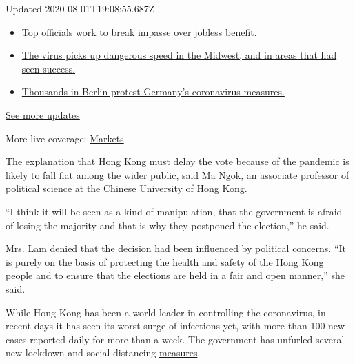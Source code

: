 Updated 2020-08-01T19:08:55.687Z

\begin{itemize}
\tightlist
\item
  \href{https://www.nytimes3xbfgragh.onion/2020/08/01/world/coronavirus-covid-19.html?action=click\&pgtype=Article\&state=default\&region=MAIN_CONTENT_1\&context=storylines_live_updates\#link-3ac56579}{Top
  officials work to break impasse over jobless benefit.}
\item
  \href{https://www.nytimes3xbfgragh.onion/2020/08/01/world/coronavirus-covid-19.html?action=click\&pgtype=Article\&state=default\&region=MAIN_CONTENT_1\&context=storylines_live_updates\#link-8796723}{The
  virus picks up dangerous speed in the Midwest, and in areas that had
  seen success.}
\item
  \href{https://www.nytimes3xbfgragh.onion/2020/08/01/world/coronavirus-covid-19.html?action=click\&pgtype=Article\&state=default\&region=MAIN_CONTENT_1\&context=storylines_live_updates\#link-25930521}{Thousands
  in Berlin protest Germany's coronavirus measures.}
\end{itemize}

\href{https://www.nytimes3xbfgragh.onion/2020/08/01/world/coronavirus-covid-19.html?action=click\&pgtype=Article\&state=default\&region=MAIN_CONTENT_1\&context=storylines_live_updates}{See
more updates}

More live coverage:
\href{https://www.nytimes3xbfgragh.onion/live/2020/07/31/business/stock-market-today-coronavirus?action=click\&pgtype=Article\&state=default\&region=MAIN_CONTENT_1\&context=storylines_live_updates}{Markets}

The explanation that Hong Kong must delay the vote because of the
pandemic is likely to fall flat among the wider public, said Ma Ngok, an
associate professor of political science at the Chinese University of
Hong Kong.

``I think it will be seen as a kind of manipulation, that the government
is afraid of losing the majority and that is why they postponed the
election,'' he said.

Mrs. Lam denied that the decision had been influenced by political
concerns. ``It is purely on the basis of protecting the health and
safety of the Hong Kong people and to ensure that the elections are held
in a fair and open manner,'' she said.

While Hong Kong has been a world leader in controlling the coronavirus,
in recent days it has seen its worst surge of infections yet, with more
than 100 new cases reported daily for more than a week. The government
has unfurled several new lockdown and social-distancing
\href{https://www.nytimes3xbfgragh.onion/2020/07/31/world/asia/hongkong-dining-lunch-coronavirus.html}{measures}.

